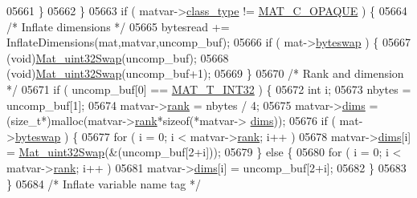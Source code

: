 \begin{DoxyCode}
{{{{{{{{{{{{{{{{{{{{{{{{{{{{{{{{{{05661                 \}
05662             \}
05663             \textcolor{keywordflow}{if} ( matvar->\hyperlink{group___m_a_t_aff13035bf3265dd7d9425e5d40c839d4}{class\_type} != \hyperlink{group___m_a_t_ggad4d60ae7b709fc81bfd744fb4c857c40ad83c684d250e463c1a3779647695c0c9}{MAT\_C\_OPAQUE} ) \{
05664                 \textcolor{comment}{/* Inflate dimensions */}
05665                 bytesread += InflateDimensions(mat,matvar,uncomp\_buf);
05666                 \textcolor{keywordflow}{if} ( mat->\hyperlink{struct__mat__t_a99d207977af5e04941ace56d71817a40}{byteswap} ) \{
05667                     (void)\hyperlink{endian_8c_a8cb0d0750e2eaf9840d95db531934f4f}{Mat\_uint32Swap}(uncomp\_buf);
05668                     (void)\hyperlink{endian_8c_a8cb0d0750e2eaf9840d95db531934f4f}{Mat\_uint32Swap}(uncomp\_buf+1);
05669                 \}
05670                 \textcolor{comment}{/* Rank and dimension */}
05671                 \textcolor{keywordflow}{if} ( uncomp\_buf[0] == \hyperlink{group___m_a_t_ggacf7b3b879282b7ab3a51190e49bf3453a83e06a68320726c6572bfbb9f3addb1d}{MAT\_T\_INT32} ) \{
05672                     \textcolor{keywordtype}{int} i;
05673                     nbytes = uncomp\_buf[1];
05674                     matvar->\hyperlink{group___m_a_t_a84ba70c96ded13cc555fa75b768d9921}{rank} = nbytes / 4;
05675                     matvar->\hyperlink{group___m_a_t_a8e01234e1c862ce3472bb37f5a09b92c}{dims} = (\textcolor{keywordtype}{size\_t}*)malloc(matvar->\hyperlink{group___m_a_t_a84ba70c96ded13cc555fa75b768d9921}{rank}*\textcolor{keyword}{sizeof}(*matvar->
      \hyperlink{group___m_a_t_a8e01234e1c862ce3472bb37f5a09b92c}{dims}));
05676                     \textcolor{keywordflow}{if} ( mat->\hyperlink{struct__mat__t_a99d207977af5e04941ace56d71817a40}{byteswap} ) \{
05677                         \textcolor{keywordflow}{for} ( i = 0; i < matvar->\hyperlink{group___m_a_t_a84ba70c96ded13cc555fa75b768d9921}{rank}; i++ )
05678                             matvar->\hyperlink{group___m_a_t_a8e01234e1c862ce3472bb37f5a09b92c}{dims}[i] = \hyperlink{endian_8c_a8cb0d0750e2eaf9840d95db531934f4f}{Mat\_uint32Swap}(&(uncomp\_buf[2+i]));
05679                     \} \textcolor{keywordflow}{else} \{
05680                         \textcolor{keywordflow}{for} ( i = 0; i < matvar->\hyperlink{group___m_a_t_a84ba70c96ded13cc555fa75b768d9921}{rank}; i++ )
05681                             matvar->\hyperlink{group___m_a_t_a8e01234e1c862ce3472bb37f5a09b92c}{dims}[i] = uncomp\_buf[2+i];
05682                     \}
05683                 \}
05684                 \textcolor{comment}{/* Inflate variable name tag */}
}}}}}}}}}}}}}}}}}}}}}}}}}}}}}}}}}}
\end{DoxyCode}
